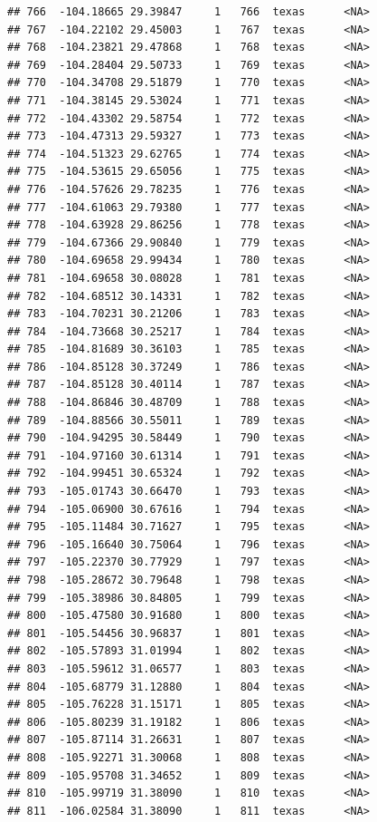 \documentclass[
]{article}
\begin{document}
\begin{verbatim}
## 766  -104.18665 29.39847     1   766  texas      <NA>
## 767  -104.22102 29.45003     1   767  texas      <NA>
## 768  -104.23821 29.47868     1   768  texas      <NA>
## 769  -104.28404 29.50733     1   769  texas      <NA>
## 770  -104.34708 29.51879     1   770  texas      <NA>
## 771  -104.38145 29.53024     1   771  texas      <NA>
## 772  -104.43302 29.58754     1   772  texas      <NA>
## 773  -104.47313 29.59327     1   773  texas      <NA>
## 774  -104.51323 29.62765     1   774  texas      <NA>
## 775  -104.53615 29.65056     1   775  texas      <NA>
## 776  -104.57626 29.78235     1   776  texas      <NA>
## 777  -104.61063 29.79380     1   777  texas      <NA>
## 778  -104.63928 29.86256     1   778  texas      <NA>
## 779  -104.67366 29.90840     1   779  texas      <NA>
## 780  -104.69658 29.99434     1   780  texas      <NA>
## 781  -104.69658 30.08028     1   781  texas      <NA>
## 782  -104.68512 30.14331     1   782  texas      <NA>
## 783  -104.70231 30.21206     1   783  texas      <NA>
## 784  -104.73668 30.25217     1   784  texas      <NA>
## 785  -104.81689 30.36103     1   785  texas      <NA>
## 786  -104.85128 30.37249     1   786  texas      <NA>
## 787  -104.85128 30.40114     1   787  texas      <NA>
## 788  -104.86846 30.48709     1   788  texas      <NA>
## 789  -104.88566 30.55011     1   789  texas      <NA>
## 790  -104.94295 30.58449     1   790  texas      <NA>
## 791  -104.97160 30.61314     1   791  texas      <NA>
## 792  -104.99451 30.65324     1   792  texas      <NA>
## 793  -105.01743 30.66470     1   793  texas      <NA>
## 794  -105.06900 30.67616     1   794  texas      <NA>
## 795  -105.11484 30.71627     1   795  texas      <NA>
## 796  -105.16640 30.75064     1   796  texas      <NA>
## 797  -105.22370 30.77929     1   797  texas      <NA>
## 798  -105.28672 30.79648     1   798  texas      <NA>
## 799  -105.38986 30.84805     1   799  texas      <NA>
## 800  -105.47580 30.91680     1   800  texas      <NA>
## 801  -105.54456 30.96837     1   801  texas      <NA>
## 802  -105.57893 31.01994     1   802  texas      <NA>
## 803  -105.59612 31.06577     1   803  texas      <NA>
## 804  -105.68779 31.12880     1   804  texas      <NA>
## 805  -105.76228 31.15171     1   805  texas      <NA>
## 806  -105.80239 31.19182     1   806  texas      <NA>
## 807  -105.87114 31.26631     1   807  texas      <NA>
## 808  -105.92271 31.30068     1   808  texas      <NA>
## 809  -105.95708 31.34652     1   809  texas      <NA>
## 810  -105.99719 31.38090     1   810  texas      <NA>
## 811  -106.02584 31.38090     1   811  texas      <NA>

\end{verbatim}
\end{document}
